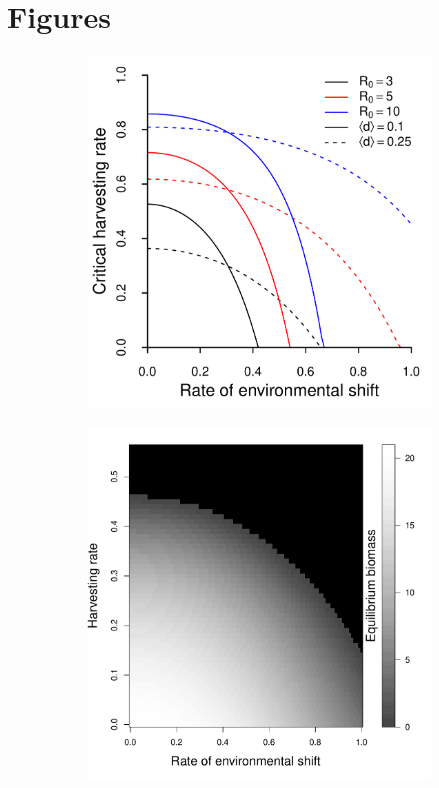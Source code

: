\documentclass[12pt,english]{article}
\begin{document}

\pagebreak
\section{Figures}

\begin{figure}[htbp]
\begin{subfigure}{3in}
\subcaption{\label{rates}}
\includegraphics[width=\textwidth]{plots/critical_rates.pdf}
\end{subfigure}
\begin{subfigure}{3in}
\subcaption{\label{biomass}}
\includegraphics[width=\textwidth]{plots/eqbiomass.pdf}
\end{subfigure}


\end{figure}
\end{document}
